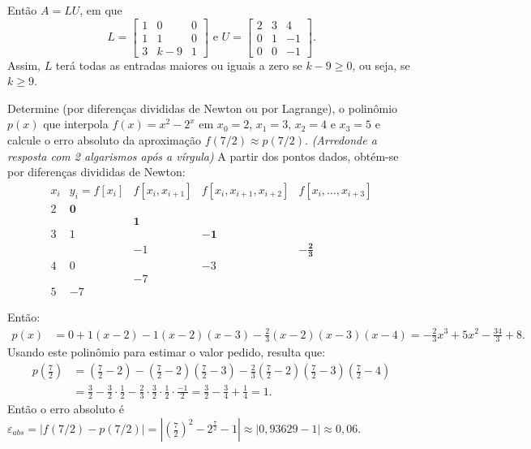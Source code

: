\documentclass[12pt,a4paper]{article}
\begin{document}
\begin{ExerciseList}
Então $A = LU$, em que
\[
L =
\begin{bmatrix}
1 & 0 & 0 \\
1 & 1 & 0 \\
3 & k - 9 & 1
\end{bmatrix}
\text{ e }
U =
\begin{bmatrix}
2 & 3 & 4 \\
0 & 1 & -1 \\
0 & 0 & -1
\end{bmatrix}.
\]
Assim, $L$ terá todas as entradas maiores ou iguais a zero se $k - 9 \geq 0$, ou seja, se $k \geq 9$.

\Exercise[title={2,0}] Determine (por diferenças divididas de Newton ou por Lagrange), o polinômio $p(x)$ que interpola $f(x) = x^2 - 2^x$ em $x_0 = 2$, $x_1 = 3$, $x_2 = 4$ e $x_3 = 5$ e calcule o erro absoluto da aproximação $f(7/2) \approx p(7/2)$.
{\color{blue} \textit{(Arredonde a resposta com 2 algarismos após a vírgula)}}
\Answer A partir dos pontos dados, obtém-se por diferenças divididas de Newton:
\[
\begin{array}{cccccc}
x_i
& y_i=f[x_i]
& f[x_i,x_{i+1}]
& f[x_i,x_{i+1},x_{i+2}]
& f[x_i,\ldots,x_{i+3}]\\
2 & \mathbf{0} \\
  & & \mathbf{1} \\
3 & 1 & & \mathbf{-1} \\
  & & -1 & & \mathbf{-\frac{2}{3}} \\
4 & 0 & & -3\\
  & & -7 \\
5 & -7
\end{array}
\]

Então:
\begin{align*}
p(x)
&=0
 +1 (x-2)
 -1 (x-2)(x-3)
 -\frac{2}{3} (x-2)(x-3)(x-4)
  = -\frac{2}{3}x^3 + 5x^2 - \frac{34}{3} + 8.
\end{align*}
Usando este polinômio para estimar o valor pedido, resulta que:
\begin{align*}
  p\left(\frac{7}{2}\right)
  & =\left(\frac{7}{2}-2\right)
  -\left(\frac{7}{2}-2\right)\left(\frac{7}{2}-3\right)
  -\frac{2}{3} \left(\frac{7}{2}-2\right)\left(\frac{7}{2}-3\right)\left(\frac{7}{2}-4\right) \\
  & =\frac{3}{2}
  -\frac{3}{2} \cdot \frac{1}{2}
  -\frac{2}{3} \cdot \frac{3}{2}\cdot \frac{1}{2}\cdot \frac{-1}{2}
  =\frac{3}{2}
  -\frac{3}{4}
  +\frac{1}{4}
  = 1.
\end{align*}
Então o erro absoluto é $\varepsilon_{abs} = |f(7/2) - p(7/2)| = \left|\left(\frac{7}{2}\right)^2 - 2^{\frac{7}{2}} - 1 \right| \approx |0,93629 - 1| \approx 0,06$.


\end{ExerciseList}
\end{document}

